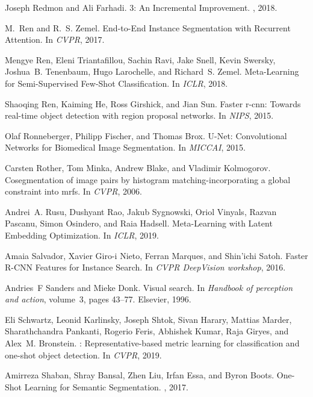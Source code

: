 \documentclass{article}
\begin{document}
{\begin{thebibliography}{10}
Joseph Redmon and Ali Farhadi.
3: {An} {Incremental} {Improvement}.
, 2018.

M.~Ren and R.~S. Zemel.
\newblock End-to-{End} {Instance} {Segmentation} with {Recurrent} {Attention}.
\newblock In {\em {CVPR}}, 2017.

Mengye Ren, Eleni Triantafillou, Sachin Ravi, Jake Snell, Kevin Swersky,
  Joshua~B. Tenenbaum, Hugo Larochelle, and Richard~S. Zemel.
\newblock Meta-{Learning} for {Semi}-{Supervised} {Few}-{Shot}
  {Classification}.
\newblock In {\em {ICLR}}, 2018.

Shaoqing Ren, Kaiming He, Ross Girshick, and Jian Sun.
\newblock Faster r-cnn: {Towards} real-time object detection with region
  proposal networks.
\newblock In {\em {NIPS}}, 2015.

Olaf Ronneberger, Philipp Fischer, and Thomas Brox.
\newblock U-{Net}: {Convolutional} {Networks} for {Biomedical} {Image}
  {Segmentation}.
\newblock In {\em {MICCAI}}, 2015.

Carsten Rother, Tom Minka, Andrew Blake, and Vladimir Kolmogorov.
\newblock Cosegmentation of image pairs by histogram matching-incorporating a
  global constraint into mrfs.
\newblock In {\em {CVPR}}, 2006.

Andrei~A. Rusu, Dushyant Rao, Jakub Sygnowski, Oriol Vinyals, Razvan Pascanu,
  Simon Osindero, and Raia Hadsell.
\newblock Meta-{Learning} with {Latent} {Embedding} {Optimization}.
\newblock In {\em {ICLR}}, 2019.

Amaia Salvador, Xavier Giro-i Nieto, Ferran Marques, and Shin'ichi Satoh.
\newblock Faster {R}-{CNN} {Features} for {Instance} {Search}.
\newblock In {\em {CVPR} {DeepVision} workshop}, 2016.

Andries~F Sanders and Mieke Donk.
\newblock Visual search.
\newblock In {\em Handbook of perception and action}, volume~3, pages 43--77.
  Elsevier, 1996.

Eli Schwartz, Leonid Karlinsky, Joseph Shtok, Sivan Harary, Mattias Marder,
  Sharathchandra Pankanti, Rogerio Feris, Abhishek Kumar, Raja Giryes, and
  Alex~M. Bronstein.
: {Representative}-based metric learning for classification
  and one-shot object detection.
\newblock In {\em {CVPR}}, 2019.

Amirreza Shaban, Shray Bansal, Zhen Liu, Irfan Essa, and Byron Boots.
\newblock One-{Shot} {Learning} for {Semantic} {Segmentation}.
, 2017.


\end{thebibliography}}
\end{document}
